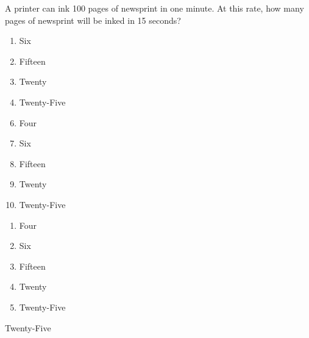 A printer can ink 100 pages of newsprint in one minute.
At this rate, how many pages of newsprint will be inked
in 15 seconds?


\ifsat
	\begin{enumerate}[label=\Alph*)]
		\item Six
		\item Fifteen
		\item Twenty
		\item Twenty-Five%
	\end{enumerate}
\else
\fi

\ifacteven
	\begin{enumerate}[label=\textbf{\Alph*.},itemsep=\fill,align=left]
		\setcounter{enumii}{5}
		\item Four
		\item Six
		\item Fifteen
		\addtocounter{enumii}{1}
		\item Twenty
		\item Twenty-Five%
	\end{enumerate}
\else
\fi

\ifactodd
	\begin{enumerate}[label=\textbf{\Alph*.},itemsep=\fill,align=left]
		\item Four
		\item Six
		\item Fifteen
		\item Twenty
		\item Twenty-Five%
	\end{enumerate}
\else
\fi

\ifgridin
 Twenty-Five%

\else
\fi

